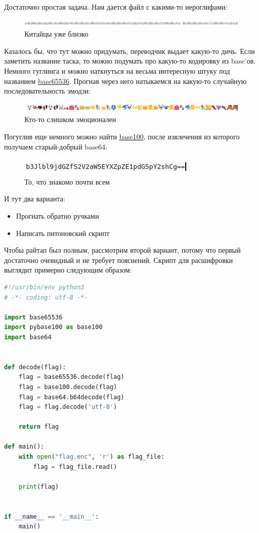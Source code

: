 \documentclass[idxtotoc,hyperref,openany,oneside]{files/crypto} %
\begin{document}
Достаточно простая задача. Нам дается файл с какими-то иероглифами:
\begin{figure}[H]
\begin{center}
\includegraphics[width=1.0\linewidth]{files/chinese}
\end{center}
\caption{Китайцы уже близко}
\label{fig:chinese}
\end{figure}
Казалось бы, что тут можно придумать, переводчик выдает какую-то дичь. Если заметить название таска, то можно подумать про какую-то кодировку из base'ов. Немного гуглинга и можно наткнуться на весьма интересную штуку под названием \href{https://github.com/qntm/base65536}{base65536}. Прогнав через него натыкаемся на какую-то случайную последовательность эмодзи:
\begin{figure}[H]
\begin{center}
\includegraphics[width=1.0\linewidth]{files/emoji}
\end{center}
\caption{Кто-то слишком эмоционален}
\label{fig:emoji}
\end{figure}
Погуглив еще немного можно найти \href{https://github.com/AdamNiederer/base100}{base100}, после извлечения из которого получаем старый-добрый base64:
\begin{figure}[H]
\begin{center}
\includegraphics[width=0.7\linewidth]{files/base64}
\end{center}
\caption{То, что знакомо почти всем}
\label{fig:base64}
\end{figure}
И тут два варианта:
\begin{itemize}
\item Прогнать обратно ручками
\item Написать питоновский скрипт
\end{itemize}
Чтобы райтап был полным, рассмотрим второй вариант, потому что первый достаточно очевидный и не требует пояснений. Скрипт для расшифровки выглядит примерно следующим образом:
\newpage
\begin{lstlisting}[language=Python, caption=Дешифровка флага]
#!/usr/bin/env python3
# -*- coding: utf-8 -*-

import base65536
import pybase100 as base100
import base64


def decode(flag):
    flag = base65536.decode(flag)
    flag = base100.decode(flag)
    flag = base64.b64decode(flag)
    flag = flag.decode('utf-8')

    return flag

def main():
    with open("flag.enc", 'r') as flag_file:
        flag = flag_file.read()

    print(flag)


if __name__ == '__main__':
    main()
\end{lstlisting}
\end{document}
